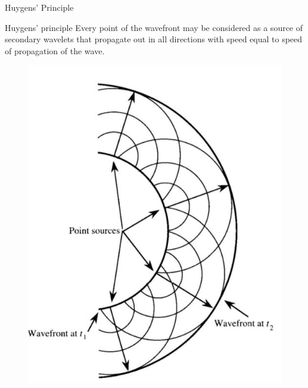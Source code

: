 \documentclass{beamer}
\begin{document}
\begin{frame}{Huygens' Principle}
    \begin{block}{Huygens' principle}
        Every point of the wavefront may be considered as a source of secondary wavelets that propagate out in all directions with speed equal to speed of propagation of the wave.
    \end{block}

    \begin{figure}[htbp]
        \centering
        \includegraphics[height=0.5\textheight]{Images/huygens.jpg}
    \end{figure}
\end{frame}
\end{document}
